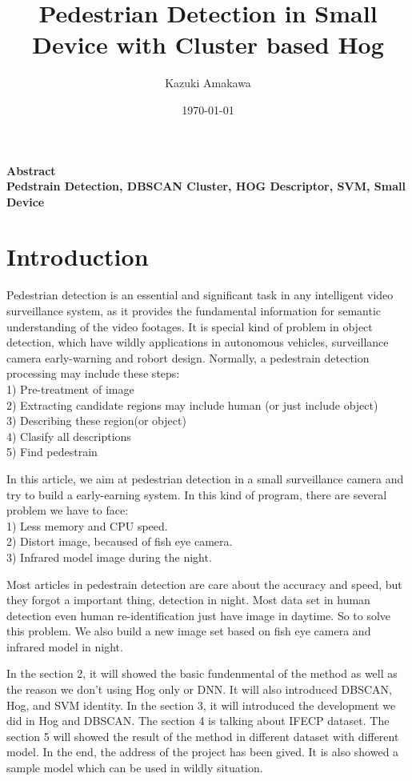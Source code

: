 \documentclass[12pt]{article}
\title{Pedestrian Detection in Small Device with Cluster based Hog}
\author{Kazuki Amakawa}
\date{\today}
\theoremstyle{plain}
\begin{document}
\maketitle
\noindent \textbf{Abstract}\\

\noindent \textbf{Pedstrain Detection, DBSCAN Cluster, HOG Descriptor, SVM, Small Device} \\
\newpage

\section{Introduction}
Pedestrian detection is an essential and significant task in any intelligent video surveillance system, as it provides the fundamental information for semantic understanding of the video footages. It is special kind of problem in object detection, which have wildly applications in autonomous vehicles, surveillance camera early-warning and robort design. Normally, a pedestrain detection processing may include these steps:\cite{Nguyen2016}
\\1) Pre-treatment of image
\\2) Extracting candidate regions may include human (or just include object)
\\3) Describing these region(or object)
\\4) Clasify all descriptions
\\5) Find pedestrain

In this article, we aim at pedestrian detection in a small surveillance camera and try to build a early-earning system. In this kind of program, there are several problem we have to face:
\\1) Less memory and CPU speed.
\\2) Distort image, becaused of fish eye camera.
\\3) Infrared model image during the night.

Most articles in pedestrain detection are care about the accuracy and speed, but they forgot a important thing, detection in night. Most data set in human detection even human re-identification just have image in daytime. So to solve this problem. We also build a new image set based on fish eye camera and infrared model in night.

In the section 2, it will showed the basic fundenmental of the method as well as the reason we don't using Hog only or DNN. It will also introduced DBSCAN, Hog, and SVM identity. In the section 3, it will introduced the development we did in Hog and DBSCAN. The section 4 is talking about IFECP dataset. The section 5 will showed the result of the method in different dataset with different model. In the end, the address of the project has been gived. It is also showed a sample model which can be used in wildly situation.
\end{document}

